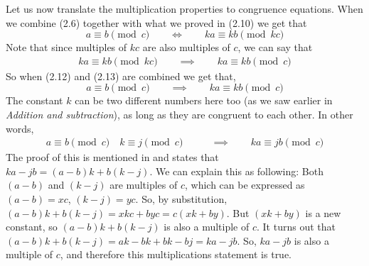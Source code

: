 Let us now translate the multiplication properties to congruence equations. When we combine (2.6) together with what we proved in (2.10) we get that
\begin{equation}
a \equiv b  \pmod {c} \qquad \iff \qquad ka\equiv kb \pmod {kc}
\end{equation}
Note that since multiples of $kc$ are also multiples of $c$, we can say that
\begin{eqnarray}
ka \equiv kb \pmod {kc} \qquad \implies \qquad ka \equiv kb \pmod c
\end{eqnarray}
So when (2.12) and (2.13) are combined we get that,
\begin{equation}
a \equiv b  \pmod {c} \qquad \implies \qquad ka \equiv kb \pmod c
\end{equation}
The constant $k$ can be two different numbers here too (as we saw earlier in \textit{Addition and subtraction}), as long as they are congruent to each other. In other words,
\begin{align*}
a \equiv b \pmod c \quad k \equiv j \pmod c \qquad &\implies \qquad  ka\equiv jb  \pmod c 
\end{align*}
The proof of this is mentioned in \cite[p. 124]{Concrete} and states that $ka-jb= (a-b)k+b(k-j)$. We can explain this as following: Both $(a-b)$ and $(k-j)$ are multiples of $c$, which can be expressed as $(a-b)=xc$, $(k-j)=yc$. So, by substitution, $(a-b)k+b(k-j) = xkc + byc = c(xk+by)$. But $(xk+by)$ is a new constant, so $(a-b)k+b(k-j)$ is also a multiple of $c$. It turns out that $(a-b)k+b(k-j) = ak-bk + bk -bj = ka -jb$. So, $ka-jb$ is also a multiple of $c$, and therefore this multiplications statement is true.





